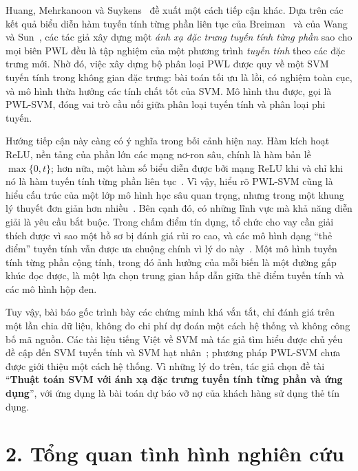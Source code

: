 Huang, Mehrkanoon và Suykens~\cite{huang2013} đề xuất một cách tiếp cận khác. Dựa trên các kết quả biểu diễn hàm tuyến tính từng phần liên tục của Breiman~\cite{breiman1993} và của Wang và Sun~\cite{wang2005}, các tác giả xây dựng một \emph{ánh xạ đặc trưng tuyến tính từng phần} sao cho mọi biên PWL đều là tập nghiệm của một phương trình \emph{tuyến tính} theo các đặc trưng mới. Nhờ đó, việc xây dựng bộ phân loại PWL được quy về một SVM tuyến tính trong không gian đặc trưng: bài toán tối ưu là lồi, có nghiệm toàn cục, và mô hình thừa hưởng các tính chất tốt của SVM. Mô hình thu được, gọi là PWL-SVM, đóng vai trò cầu nối giữa phân loại tuyến tính và phân loại phi tuyến.

Hướng tiếp cận này càng có ý nghĩa trong bối cảnh hiện nay. Hàm kích hoạt ReLU, nền tảng của phần lớn các mạng nơ-ron sâu, chính là hàm bản lề $\max\{0,t\}$; hơn nữa, một hàm số biểu diễn được bởi mạng ReLU khi và chỉ khi nó là hàm tuyến tính từng phần liên tục~\cite{arora2018}. Vì vậy, hiểu rõ PWL-SVM cũng là hiểu cấu trúc của một lớp mô hình học sâu quan trọng, nhưng trong một khung lý thuyết đơn giản hơn nhiều~\cite{tao2022}. Bên cạnh đó, có những lĩnh vực mà khả năng diễn giải là yêu cầu bắt buộc. Trong chấm điểm tín dụng, tổ chức cho vay cần giải thích được vì sao một hồ sơ bị đánh giá rủi ro cao, và các mô hình dạng “thẻ điểm” tuyến tính vẫn được ưa chuộng chính vì lý do này~\cite{thomas2002}. Một mô hình tuyến tính từng phần cộng tính, trong đó ảnh hưởng của mỗi biến là một đường gấp khúc đọc được, là một lựa chọn trung gian hấp dẫn giữa thẻ điểm tuyến tính và các mô hình hộp đen.

Tuy vậy, bài báo gốc trình bày các chứng minh khá vắn tắt, chỉ đánh giá trên một lần chia dữ liệu, không đo chi phí dự đoán một cách hệ thống và không công bố mã nguồn. Các tài liệu tiếng Việt về SVM mà tác giả tìm hiểu được chủ yếu đề cập đến SVM tuyến tính và SVM hạt nhân~\cite{vuhuutiep2018}; phương pháp PWL-SVM chưa được giới thiệu một cách hệ thống. Vì những lý do trên, tác giả chọn đề tài “\textbf{Thuật toán SVM với ánh xạ đặc trưng tuyến tính từng phần và ứng dụng}”, với ứng dụng là bài toán dự báo vỡ nợ của khách hàng sử dụng thẻ tín dụng.

\section*{2. Tổng quan tình hình nghiên cứu}

